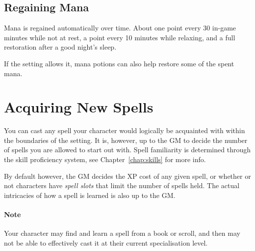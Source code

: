 \subsection{Regaining Mana}
Mana is regained automatically over time.
About one point every 30 in-game minutes while not at rest,
a point every 10 minutes while relaxing,
and a full restoration after a good night's sleep.

If the setting allows it, mana potions can also help restore some of the spent mana.

\section{Acquiring New Spells}
You can cast any spell your character would logically be acquainted with within the boundaries of the setting.
It is, however, up to the GM to decide the number of spells you are allowed to start out with.
Spell familiarity is determined through the skill proficiency system, see Chapter~\ref{chap:skills} for more info.

By default however, the GM decides the XP cost of any given spell, or whether or not characters have \textit{spell slots} that limit the number of spells held. 
The actual intricacies of how a spell is learned is also up to the GM.

\paragraph{Note} Your character may find and learn a spell from a book or scroll, and then may not be able to effectively cast it at their current specialisation level.